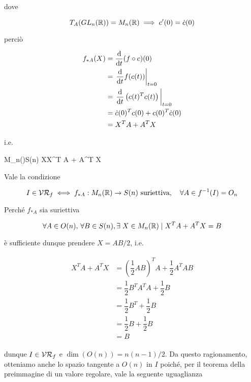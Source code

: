 dove

\begin{equation}
	T_{A}(GL_{n}(\mathbb{R})) = M_{n}(\mathbb{R}) \implies c'(0) = \dot{c}(0)
\end{equation}

perciò

\begin{align}
	\begin{split}
		f_{*A}(X) &= \dv{t} (f \circ c) (0) \\
		&= \eval{ \dv{t} f(c(t)) }_{t=0} \\
		&= \eval{ \dv{t} \left( c(t)^{T} c(t) \right) }_{t=0} \\
		&= \dot{c}(0)^{T} c(0) + c(0)^{T} \dot{c}(0) \\
		&= X^{T} A + A^{T} X
	\end{split}
\end{align}

i.e.

	{M_{n}(\R)}{S(n)}
	{X}{X^{T} A + A^{T} X}

Vale la condizione

\begin{equation}
	I \in \VR_{f} %
	\iff %
	f_{*A} : M_{n}(\R) \to S(n) \text{ suriettiva} \qcomma \forall A \in f^{-1}(I) = O_{n}
\end{equation}

Perché $ f_{*A} $ sia suriettiva

\begin{equation}
	\forall A \in O(n), \, \forall B \in S(n), \exists \; X \in M_{n}(\mathbb{R}) \mid X^{T} A + A^{T} X = B
\end{equation}

è sufficiente dunque prendere $ X = A B / 2 $, i.e.

\begin{align}
	\begin{split}
		X^{T} A + A^{T} X &= \left( \dfrac{1}{2} A B \right)^{T} A + \dfrac{1}{2} A^{T} A B \\
		&= \dfrac{1}{2} B^{T} A^{T} A + \dfrac{1}{2} B \\
		&= \dfrac{1}{2} B^{T} + \dfrac{1}{2} B \\
		&= \dfrac{1}{2} B + \dfrac{1}{2} B \\
		&= B
	\end{split}
\end{align}

dunque $ I \in \mathcal{VR}_{f} $ e $ \dim(O(n)) = n(n-1)/2 $. Da questo ragionamento, otteniamo anche lo spazio tangente a $ O(n) $ in $ I $ poiché, per il teorema della preimmagine di un valore regolare, vale la seguente uguaglianza


